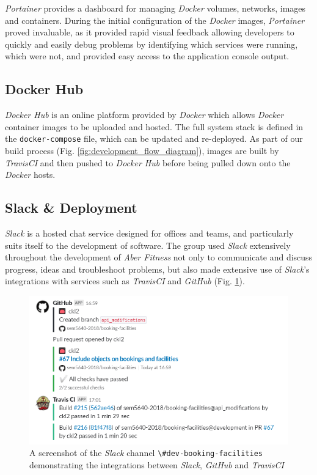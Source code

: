 \textit{Portainer} provides a dashboard for managing \textit{Docker} volumes, networks, images and containers. During the initial configuration of the \textit{Docker} images, \textit{Portainer} proved invaluable, as it provided rapid visual feedback allowing developers to quickly and easily debug problems by identifying which services were running, which were not, and provided easy access to the application console output.

\subsection{Docker Hub}
\textit{Docker Hub} is an online platform provided by \textit{Docker} which allows \textit{Docker} container images to be uploaded and hosted. The full system stack is defined in the \lstinline{docker-compose} file, which can be updated and re-deployed. As part of our build process (Fig. \ref{fig:development_flow_diagram}), images are built by \textit{TravisCI} and then pushed to \textit{Docker Hub} before being pulled down onto the \textit{Docker} hosts.

\subsection{Slack \& Deployment}
\textit{Slack} is a hosted chat service designed for offices and teams, and particularly suits itself to the development of software. The group used \textit{Slack} extensively throughout the development of \textit{Aber Fitness} not only to communicate and discuss progress, ideas and troubleshoot problems, but also made extensive use of \textit{Slack}'s integrations with services such as \textit{TravisCI} and \textit{GitHub} (Fig. \ref{fig:slack_travis_github}).

\begin{figure}[H]
    \centering
    \includegraphics[width=\textwidth]{Images/Slack_Travis_GitHub.png}
    \caption{A screenshot of the \textit{Slack} channel \lstinline{\#dev-booking-facilities} demonstrating the integrations between \textit{Slack}, \textit{GitHub} and \textit{TravisCI}}
    \label{fig:slack_travis_github}
\end{figure}

